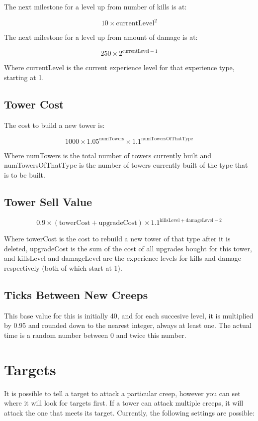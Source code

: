 \documentclass[a4paper,11pt]{article}
\begin{document}
The next milestone for a level up from number of kills is at:

\[10 \times \mathrm{currentLevel}^2\]

The next milestone for a level up from amount of damage is at:

\[250 \times 2^{\mathrm{currentLevel} - 1}\]

Where currentLevel is the current experience level for that experience type, starting at 1.

\subsection{Tower Cost}

The cost to build a new tower is:

\[1000 \times 1.05^{\mathrm{numTowers}} \times 1.1^{\mathrm{numTowersOfThatType}}\]

Where numTowers is the total number of towers currently built and numTowersOfThatType is the number of towers currently built of the type that is to be built.

\subsection{Tower Sell Value}

\[ 0.9 \times \left( \mathrm{towerCost + upgradeCost} \right) \times 1.1^{\mathrm{killsLevel + damageLevel} - 2}\]

Where towerCost is the cost to rebuild a new tower of that type after it is deleted, upgradeCost is the sum of the cost of all upgrades bought for this tower, and killsLevel and damageLevel are the experience levels for kills and damage respectively (both of which start at 1).

\subsection{Ticks Between New Creeps}

This base value for this is initially 40, and for each succesive level, it is multiplied by 0.95 and rounded down to the nearest integer, always at least one. The actual time is a random number between 0 and twice this number.

\section{Targets}
It is possible to tell a target to attack a particular creep, however you can set where it will look for targets first. If a tower can attack multiple creeps, it will attack the one that meets its target. Currently, the following settings are possible:
\end{document}
